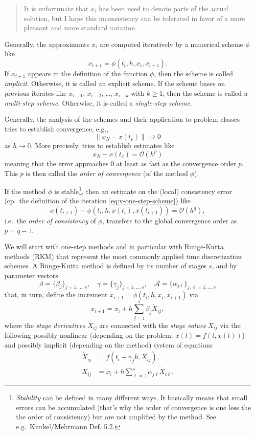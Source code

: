 \documentclass[]{book}
\newenvironment {JHSAYS} [0] {\begin{quote}\color{jhsc}} {\end{quote}}
\theoremstyle{definition}
\theoremstyle{definition}
\theoremstyle{definition}
\theoremstyle{definition}
\theoremstyle{remark}
\begin{document}
\begin{JHSAYS}
It is unfortunate that \(x_i\) has been used to denote parts of the actual solution, but I hope this inconsistency can be tolerated in favor of a more pleasant and more standard notation.
\end{JHSAYS}

Generally, the approximants \(x_i\) are computed iteratively by a numerical scheme \(\phi\) like
\[
x_{i+1} = \phi(t_i,h,x_i,x_{i+1}). \label{eq:v-one-step-scheme}
\]
If \(x_{i+1}\) appears in the definition of the function \(\phi\), then the scheme is called \emph{implicit}.
Otherwise, it is called an explicit scheme.
If the scheme bases on previous iterates like \(x_{i-1}\), \(x_{i-2}\), \ldots{}, \(x_{i-k}\) with \(k\geq 1\), then the scheme is called a \emph{multi-step scheme}.
Otherwise, it is called a \emph{single-step scheme}.

Generally, the analysis of the schemes and their application to problem classes tries to establish convergence, e.g.,
\[
\|x_N - x(t_e)\| \to 0
\]
as \(h \to 0\). More precisely, tries to establish estimates like
\[
x_N - x(t_e) = \mathcal O(h^p)
\]
meaning that the error approaches \(0\) at least as fast as the convergence order \(p\). This \(p\) is then called the \emph{order of convergence} (of the method \(\phi\)).

If the method \(\phi\) is stable\footnote{\emph{Stability} can be defined in many different ways. It basically means that small errors can be accumulated (that's why the order of convergence is one less the the order of consistency) but are not amplified by the method. See e.g.~Kunkel/Mehrmann Def. 5.2.}, then an estimate on the (local) consistency error (cp.~the definition of the iteration \eqref{eq:v-one-step-scheme}) like
\[
x(t_{i+1}) - \phi(t_i, h, x(t_i), x(t_{i+1})) = \mathcal O(h^q),
\]
i.e.~the \emph{order of consistency} of \(\phi\), transfers to the global convergence order as \(p=q-1\).

We will start with one-step methods and in particular with Runge-Kutta methods (RKM) that represent the most commonly applied time discretization schemes. A Runge-Kutta method is defined by its number of stages \(s\), and by parameter vectors
\[
\beta = \{\beta_j\}_{j=1, \dotsc, s}, \quad \gamma=\{\gamma_j\}_{j=1,\dotsc,s}, \quad 
\mathcal A = \{\alpha_{j\ell}\}_{j,\ell=1, \dotsc, s}
\]
that, in turn, define the increment \(x_{i+1}=\phi(t_i,h,x_i,x_{i+1})\) via
\[
x_{i+1}=x_i+h\sum_{j=1}^s\beta_j \dot X_{ij},
\]
where the \emph{stage derivatives} \(\dot X_{ij}\) are connected with the \emph{stage values} \(X_{ij}\) via the following possibly nonlinear (depending on the problem: \(\dot x(t) = f(t,x(t))\)) and possibly implicit (depending on the method) system of equations
\begin{align}
\dot X_{ij} &= f(t_i+\gamma_jh, X_{ij}), \\
X_{ij} &= x_i + h \sum_{\ell=1}^s \alpha_{j\ell} \dot X_{i\ell}.
\end{align}
\end{document}
